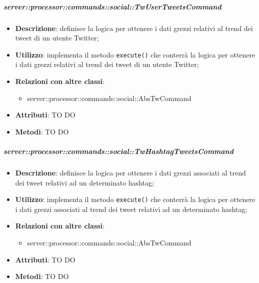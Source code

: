         \subparagraph{server::processor::commands::social::TwUserTweetsCommand} %
        \label{subp:bdsm_app_server_processor_commands_social_twcommand}
        \begin{itemize}
          \item \textbf{Descrizione}: definisce la logica per ottenere i dati grezzi relativi al trend dei tweet di un utente Twitter;
          \item \textbf{Utilizzo}: implementa il metodo \texttt{execute()} che conterrà la logica per ottenere i dati grezzi relativi al trend dei tweet di un utente Twitter;
          \item \textbf{Relazioni con altre classi}:
            \begin{itemize}
              \item server::processor::commands::social::AbsTwCommand
            \end{itemize}
			\item \textbf{Attributi}: TO DO
			\item \textbf{Metodi}: TO DO
        \end{itemize}

        \subparagraph{server::processor::commands::social::TwHashtagTweetsCommand} %
        \label{subp:bdsm_app_server_processor_commands_social_twhashtagtweetscommand}
        \begin{itemize}
          \item \textbf{Descrizione}: definisce la logica per ottenere i dati grezzi associati al trend dei tweet relativi ad un determinato hashtag;
          \item \textbf{Utilizzo}: implementa il metodo \texttt{execute()} che conterrà la logica per ottenere i dati grezzi associati al trend dei tweet relativi ad un determinato hashtag;
          \item \textbf{Relazioni con altre classi}:
            \begin{itemize}
              \item server::processor::commands::social::AbsTwCommand
            \end{itemize}
			\item \textbf{Attributi}: TO DO
			\item \textbf{Metodi}: TO DO
        \end{itemize}


